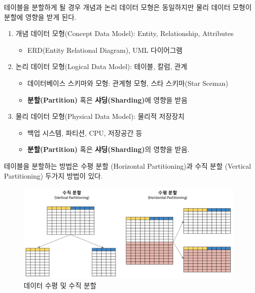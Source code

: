 \documentclass[
  letterpaper,
  chapter,a4paper,showtrims,openright,hidelinks]{oblivoir}
\providecommand{\tightlist}{%
  \setlength{\itemsep}{0pt}\setlength{\parskip}{0pt}}\usepackage{longtable,booktabs,array}
\begin{document}
테이블을 분할하게 될 경우 개념과 논리 데이터 모형은 동일하지만 물리
데이터 모형이 분할에 영향을 받게 된다.

\begin{enumerate}
\def\labelenumi{\arabic{enumi}.}
\tightlist
\item
  개념 데이터 모형(Concept Data Model): Entity, Relationship, Attributes

  \begin{itemize}
  \tightlist
  \item
    ERD(Entity Relational Diagram), UML 다이어그램
  \end{itemize}
\item
  논리 데이터 모형(Logical Data Model): 테이블, 칼럼, 관계

  \begin{itemize}
  \tightlist
  \item
    데이터베이스 스키마와 모형: 관계형 모형, 스타 스키마(Star Sceman)
  \item
    \textbf{분할(Partition)} 혹은 \textbf{샤딩(Sharding)}에 영향을 받음
  \end{itemize}
\item
  물리 데이터 모형(Physical Data Model): 물리적 저장장치

  \begin{itemize}
  \tightlist
  \item
    백업 시스템, 파티션, CPU, 저장공간 등
  \item
    \textbf{분할(Partition)} 혹은 \textbf{샤딩(Sharding)}의 영향을 받음.
  \end{itemize}
\end{enumerate}

테이블을 분할하는 방법은 수평 분할 (Horizontal Partitioning)과 수직 분할
(Vertical Partitioning) 두가지 방법이 있다.

\begin{figure}

{\centering \includegraphics{images/database_partition.png}

}

\caption{데이터 수평 및 수직 분할}

\end{figure}
\end{document}
